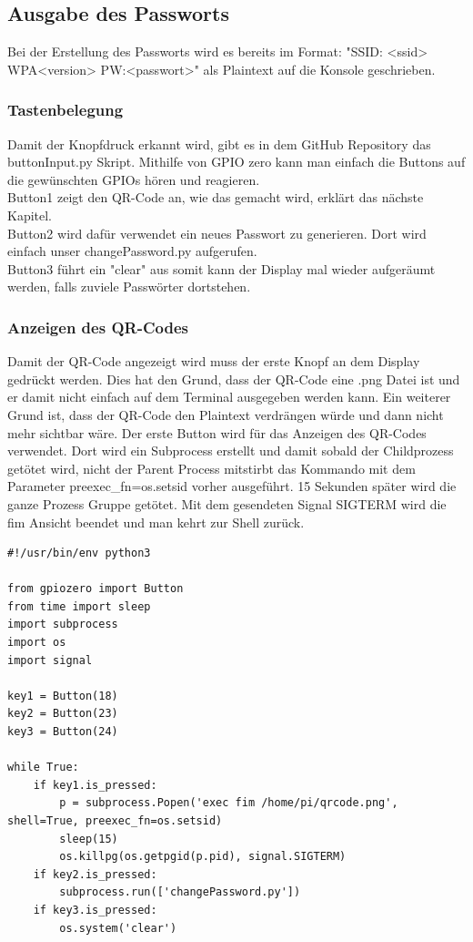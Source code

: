 \documentclass[a4paper,11pt,singlespacing]{article}
\begin{document}
    		
    	\subsection{Ausgabe des Passworts}
    		
    		Bei der Erstellung des Passworts wird es bereits im Format: "SSID: <ssid> WPA<version> PW:<passwort>" als Plaintext auf die Konsole geschrieben.
    		\subsubsection{Tastenbelegung}
    		    Damit der Knopfdruck erkannt wird, gibt es in dem GitHub Repository \cite{Quote_github_repo} das buttonInput.py Skript. Mithilfe von GPIO zero kann man einfach die Buttons auf die gewünschten GPIOs hören und reagieren. \\
	    		Button1 zeigt den QR-Code an, wie das gemacht wird, erklärt das nächste Kapitel. \\
	    		Button2 wird dafür verwendet ein neues Passwort zu generieren. Dort wird einfach unser changePassword.py aufgerufen. \\
	    		Button3 führt ein "clear" aus somit kann der Display mal wieder aufgeräumt werden, falls zuviele Passwörter dortstehen.
    		
    		\subsubsection{Anzeigen des QR-Codes}
    			Damit der QR-Code angezeigt wird muss der erste Knopf an dem Display gedrückt werden. Dies hat den Grund, dass der QR-Code eine .png Datei ist und er damit nicht einfach auf dem Terminal ausgegeben werden kann. Ein weiterer Grund ist, dass der QR-Code den Plaintext verdrängen würde und dann nicht mehr sichtbar wäre. 
    			Der erste Button wird für das Anzeigen des QR-Codes verwendet. Dort wird ein Subprocess erstellt und damit sobald der Childprozess getötet wird, nicht der Parent Process mitstirbt das Kommando mit dem Parameter preexec\_fn=os.setsid vorher ausgeführt. 15 Sekunden später wird die ganze Prozess Gruppe getötet. Mit dem gesendeten Signal SIGTERM wird die fim Ansicht beendet und man kehrt zur Shell zurück. \\ 
    			\begin{lstlisting}
#!/usr/bin/env python3

from gpiozero import Button
from time import sleep
import subprocess
import os
import signal

key1 = Button(18)
key2 = Button(23)
key3 = Button(24)

while True:
	if key1.is_pressed:
		p = subprocess.Popen('exec fim /home/pi/qrcode.png', shell=True, preexec_fn=os.setsid)
		sleep(15)
		os.killpg(os.getpgid(p.pid), signal.SIGTERM)
	if key2.is_pressed:
		subprocess.run(['changePassword.py'])
	if key3.is_pressed:
		os.system('clear')
    			\end{lstlisting}
    
\end{document}
